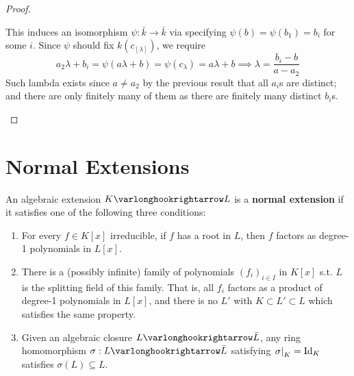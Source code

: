 \documentclass{article}
\begin{document}
\begin{proof}
\begin{itemize}
        \begin{minipage}{\linewidth}
            \centering
        \end{minipage}
        This induces an isomorphism $\psi: \bar{k} \to \bar{k}$ via specifying $\psi(b) = \psi(b_1) = b_i$ for some $i$. Since $\psi$ should fix $k(c_[\lambda])$, we require
        \[
            a_2 \lambda + b_i = \psi(a \lambda + b) = \psi(c_{\lambda}) = a \lambda + b \implies \lambda = \frac{b_i - b}{a - a_2}
        \]
        Such lambda exists since $a \neq a_2$ by the previous result that all $a_i$s are distinct; and there are only finitely many of them as there are finitely many distinct $b_i$s.
    \end{itemize}
\end{proof}

\section{Normal Extensions}

\begin{definition}\label{def: normal extension}
    An algebraic extension $K \ext L$ is a \textbf{normal extension} if it satisfies one of the following three conditions:
    \begin{enumerate}[label=\arabic*)]
        \item For every $f \in K[x]$ irreducible, if $f$ has a root in $L$, then $f$ factors as degree-1 polynomials in $L[x]$.
        \item There is a (possibly infinite) family of polynomials $(f_i)_{i \in I}$ in $K[x]$ s.t. $L$ is the splitting field of this family. That is, all $f_i$ factors as a product of degree-1 polynomials in $L[x]$, and there is no $L'$ with $K \subset L' \subset L$ which satisfies the same property. 
        \item Given an algebraic closure $L \ext \bar{L}$, any ring homomorphism $\sigma: L \ext \bar{L}$ satisfying $\left.\sigma\right|_{K} = \mathrm{Id}_K$ satisfies $\sigma(L) \subseteq L$.
    \end{enumerate}
\end{definition}
\end{document}

